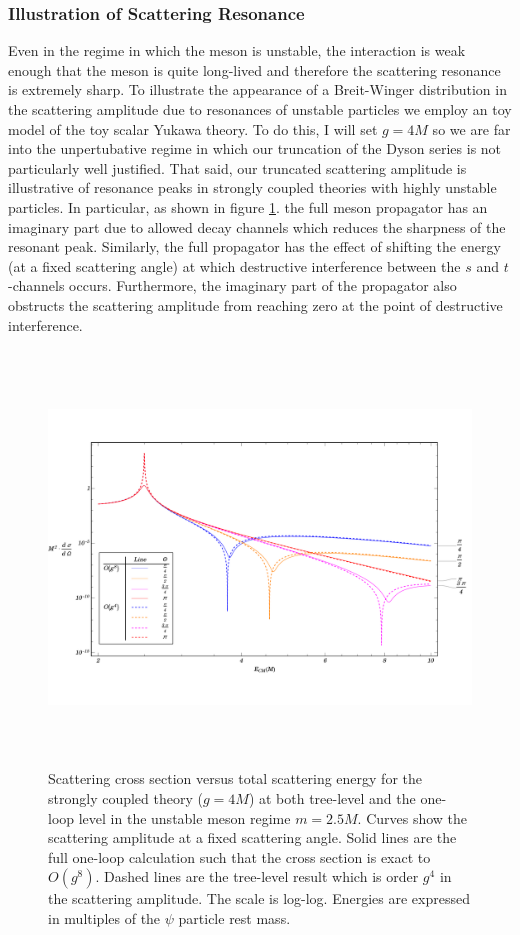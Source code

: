 \documentclass{article}
\begin{document}
\subsubsection{Illustration of Scattering Resonance}
Even in the regime in which the meson is unstable, the interaction is weak enough that the meson is quite long-lived and therefore the scattering resonance is extremely sharp. To illustrate the appearance of a Breit-Winger distribution in the scattering amplitude due to resonances of unstable particles we employ an toy model of the toy scalar Yukawa theory. To do this, I will set $g = 4 M$ so we are far into the unpertubative regime in which our truncation of the Dyson series is not particularly well justified. That said, our truncated scattering amplitude is illustrative of resonance peaks in strongly coupled theories with highly unstable particles. In particular, as shown in figure \ref{Ill}. the full meson propagator has an imaginary part due to allowed decay channels which reduces the sharpness of the resonant peak. Similarly, the full propagator has the effect of shifting the energy (at a fixed scattering angle) at which destructive interference between the $s$ and $t$-channels occurs. Furthermore, the imaginary part of the propagator also obstructs the scattering amplitude from reaching zero at the point of destructive interference.     
\begin{figure}
\begin{center}
\includegraphics[width=15cm, height=11cm]{UnStableMeson-Illustration}
\caption{Scattering cross section versus total scattering energy for the strongly coupled theory ($g = 4 M$) at both tree-level and the one-loop level in the unstable meson regime $m = 2.5 M$. Curves show the scattering amplitude at a fixed scattering angle. Solid lines are the full one-loop calculation such that the cross section is exact to $O(g^8)$. Dashed lines are the tree-level result which is order $g^4$ in the scattering amplitude. The scale is log-log. Energies are expressed in multiples of the $\psi$ particle rest mass.} 
\label{Ill}
\end{center}
\end{figure}
\end{document}
